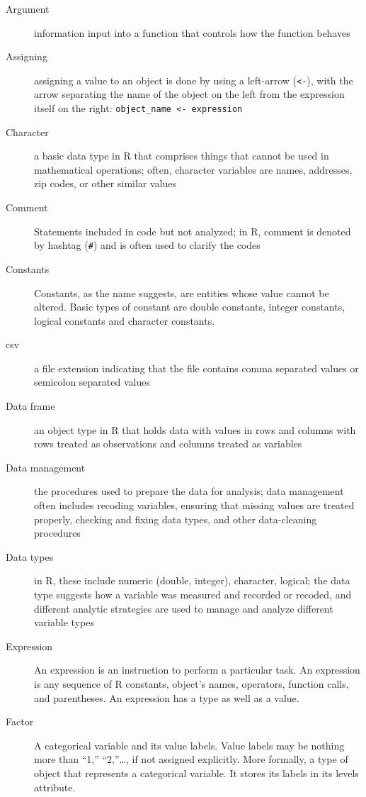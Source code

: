 \documentclass[
]{book}
\begin{document}
\begin{description}
\item[Argument]
information input into a function that controls how the function behaves
\item[Assigning]
assigning a value to an object is done by using a left-arrow (\texttt{\textless{}-}), with the arrow separating the name of the object on the left from the expression itself on the right: \texttt{object\_name\ \textless{}-\ expression}
\item[Character]
a basic data type in R that comprises things that cannot be used in mathematical operations; often, character variables are names, addresses, zip codes, or other similar values
\item[Comment]
Statements included in code but not analyzed; in R, comment is denoted by hashtag (\texttt{\#}) and is often used to clarify the codes
\item[Constants]
Constants, as the name suggests, are entities whose value cannot be altered. Basic types of constant are double constants, integer constants, logical constants and character constants.
\item[csv]
a file extension indicating that the file contains comma separated values or semicolon separated values
\item[Data frame]
an object type in R that holds data with values in rows and columns with rows treated as observations and columns treated as variables
\item[Data management]
the procedures used to prepare the data for analysis; data management often includes recoding variables, ensuring that missing values are treated properly, checking and fixing data types, and other data-cleaning procedures
\item[Data types]
in R, these include numeric (double, integer), character, logical; the data type suggests how a variable was measured and recorded or recoded, and different analytic strategies are used to manage and analyze different variable types
\item[Expression]
An expression is an instruction to perform a particular task. An expression is any sequence of R constants, object's names, operators, function calls, and parentheses. An expression has a type as well as a value.
\item[Factor]
A categorical variable and its value labels. Value labels may be nothing more than ``1,'' ``2,''\ldots, if not assigned explicitly. More formally, a type of object that represents a categorical variable. It stores its labels in its levels attribute.

\end{description}
\end{document}
